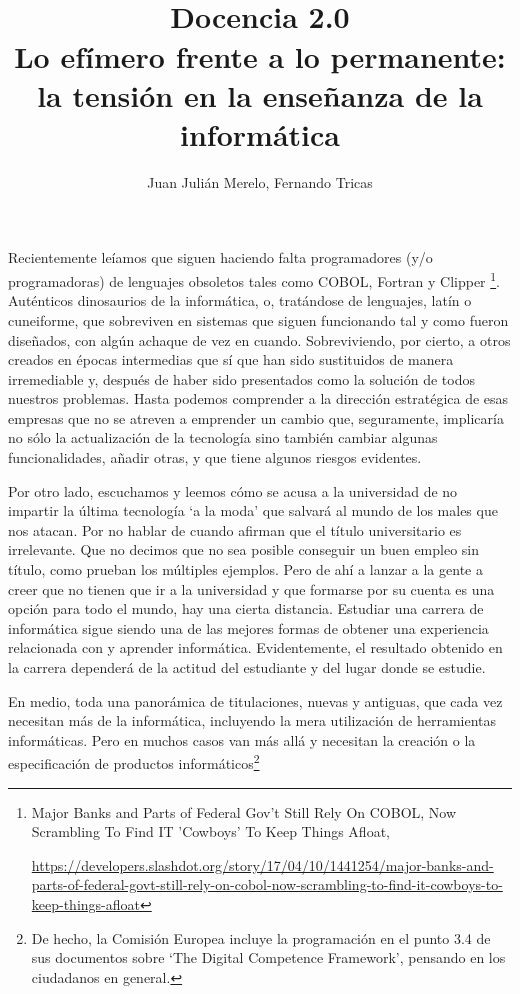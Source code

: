\documentclass[twoside,10pt]{article}
\title{\ \\ Docencia 2.0\\ \LARGE Lo efímero frente a lo permanente: la tensión en la enseñanza de la informática}
\author{\large Juan Julián Merelo, Fernando Tricas}
\date{}
\begin{document}
\addtocounter{page}{2}

\maketitle
\vspace*{-5ex}

\begin{multicols}{2}

	Recientemente leíamos que siguen haciendo falta programadores
        (y/o programadoras) de lenguajes obsoletos tales como COBOL,
        Fortran y Clipper \footnote{Major Banks and Parts of Federal
          Gov't Still Rely On COBOL, Now Scrambling To Find IT
          'Cowboys' To Keep Things Afloat,
	  
	  {\tiny
	  \url{https://developers.slashdot.org/story/17/04/10/1441254/major-banks-and-parts-of-federal-govt-still-rely-on-cobol-now-scrambling-to-find-it-cowboys-to-keep-things-afloat}}}. Auténticos
        dinosaurios de la informática, o, tratándose de lenguajes,
        latín o cuneiforme, que sobreviven en sistemas que siguen funcionando tal y como fueron diseñados, con algún achaque de vez en cuando. 
Sobreviviendo, por cierto, a otros creados en épocas intermedias que
sí que han sido sustituidos de manera irremediable y, después de haber
sido presentados como la solución de todos nuestros problemas.
Hasta podemos comprender a la dirección estratégica de esas empresas
que no se atreven a emprender un cambio que, seguramente, implicaría
no sólo la actualización de la tecnología sino también cambiar algunas
funcionalidades, añadir otras, y que tiene algunos riesgos evidentes. 

Por otro lado, escuchamos y leemos cómo se acusa a la universidad de no impartir la última tecnología `a la moda' que salvará al mundo de los males que nos atacan.
Por no hablar de cuando afirman que el título universitario es
irrelevante. Que no decimos que no sea posible conseguir un buen
empleo sin título, como prueban los múltiples ejemplos. Pero de ahí a
lanzar a la gente a creer que no tienen que ir a la universidad y que
formarse por su cuenta es una opción para todo el mundo, hay una
cierta distancia. Estudiar una carrera de informática sigue siendo una
de las mejores formas de obtener una experiencia relacionada con y
aprender informática. Evidentemente, el resultado obtenido en la
carrera dependerá de la actitud del estudiante y del lugar donde se
estudie. 

En medio, toda una panorámica de titulaciones, nuevas y
antiguas, que cada vez necesitan más de la informática, incluyendo la mera
utilización de herramientas informáticas. Pero en muchos casos van más
	allá y necesitan la creación o la especificación de productos informáticos\footnote{De hecho, la Comisión Europea incluye la programación en el punto 3.4 de sus documentos sobre `The Digital Competence Framework', pensando en los ciudadanos en general. 

}
\end{multicols}
\end{document}
